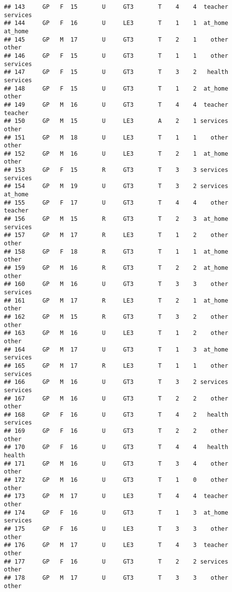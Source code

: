 \documentclass[
]{article}
\begin{document}
\begin{verbatim}
## 143     GP   F  15       U     GT3       T    4    4  teacher services
## 144     GP   F  16       U     LE3       T    1    1  at_home  at_home
## 145     GP   M  17       U     GT3       T    2    1    other    other
## 146     GP   F  15       U     GT3       T    1    1    other services
## 147     GP   F  15       U     GT3       T    3    2   health services
## 148     GP   F  15       U     GT3       T    1    2  at_home    other
## 149     GP   M  16       U     GT3       T    4    4  teacher  teacher
## 150     GP   M  15       U     LE3       A    2    1 services    other
## 151     GP   M  18       U     LE3       T    1    1    other    other
## 152     GP   M  16       U     LE3       T    2    1  at_home    other
## 153     GP   F  15       R     GT3       T    3    3 services services
## 154     GP   M  19       U     GT3       T    3    2 services  at_home
## 155     GP   F  17       U     GT3       T    4    4    other  teacher
## 156     GP   M  15       R     GT3       T    2    3  at_home services
## 157     GP   M  17       R     LE3       T    1    2    other    other
## 158     GP   F  18       R     GT3       T    1    1  at_home    other
## 159     GP   M  16       R     GT3       T    2    2  at_home    other
## 160     GP   M  16       U     GT3       T    3    3    other services
## 161     GP   M  17       R     LE3       T    2    1  at_home    other
## 162     GP   M  15       R     GT3       T    3    2    other    other
## 163     GP   M  16       U     LE3       T    1    2    other    other
## 164     GP   M  17       U     GT3       T    1    3  at_home services
## 165     GP   M  17       R     LE3       T    1    1    other services
## 166     GP   M  16       U     GT3       T    3    2 services services
## 167     GP   M  16       U     GT3       T    2    2    other    other
## 168     GP   F  16       U     GT3       T    4    2   health services
## 169     GP   F  16       U     GT3       T    2    2    other    other
## 170     GP   F  16       U     GT3       T    4    4   health   health
## 171     GP   M  16       U     GT3       T    3    4    other    other
## 172     GP   M  16       U     GT3       T    1    0    other    other
## 173     GP   M  17       U     LE3       T    4    4  teacher    other
## 174     GP   F  16       U     GT3       T    1    3  at_home services
## 175     GP   F  16       U     LE3       T    3    3    other    other
## 176     GP   M  17       U     LE3       T    4    3  teacher    other
## 177     GP   F  16       U     GT3       T    2    2 services    other
## 178     GP   M  17       U     GT3       T    3    3    other    other

\end{verbatim}
\end{document}
